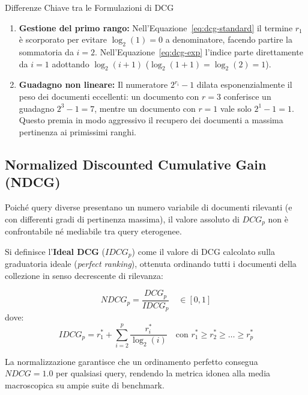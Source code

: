 \begin{noteblock}{Differenze Chiave tra le Formulazioni di DCG}
\begin{enumerate}
    \item \textbf{Gestione del primo rango:} Nell'Equazione~\eqref{eq:dcg-standard} il termine $r_1$ \`e scorporato per evitare $\log_2(1) = 0$ a denominatore, facendo partire la sommatoria da $i=2$. Nell'Equazione~\eqref{eq:dcg-exp} l'indice parte direttamente da $i=1$ adottando $\log_2(i+1)$ ($\log_2(1+1) = \log_2(2) = 1$).
    \item \textbf{Guadagno non lineare:} Il numeratore $2^{r_i} - 1$ dilata esponenzialmente il peso dei documenti eccellenti: un documento con $r=3$ conferisce un guadagno $2^3 - 1 = 7$, mentre un documento con $r=1$ vale solo $2^1 - 1 = 1$. Questo premia in modo aggressivo il recupero dei documenti a massima pertinenza ai primissimi ranghi.
\end{enumerate}
\end{noteblock}

\FloatBarrier
\subsection{Normalized Discounted Cumulative Gain (NDCG)}
\label{subsec:normalized-dcg}

Poiché query diverse presentano un numero variabile di documenti rilevanti (e con differenti gradi di pertinenza massima), il valore assoluto di $DCG_p$ non \`e confrontabile né mediabile tra query eterogenee. 

Si definisce l'\textbf{Ideal DCG} ($IDCG_p$) come il valore di DCG calcolato sulla graduatoria ideale (\textit{perfect ranking}), ottenuta ordinando tutti i documenti della collezione in senso decrescente di rilevanza:

\begin{definition}
\begin{equation}
NDCG_p = \frac{DCG_p}{IDCG_p} \quad \in [0, 1]
\end{equation}
dove:
\begin{equation}
IDCG_p = r_1^* + \sum_{i=2}^p \frac{r_i^*}{\log_2(i)} \quad \text{con } r_1^* \ge r_2^* \ge \dots \ge r_p^*
\end{equation}
\end{definition}

La normalizzazione garantisce che un ordinamento perfetto consegua $NDCG = 1.0$ per qualsiasi query, rendendo la metrica idonea alla media macroscopica su ampie suite di benchmark.

